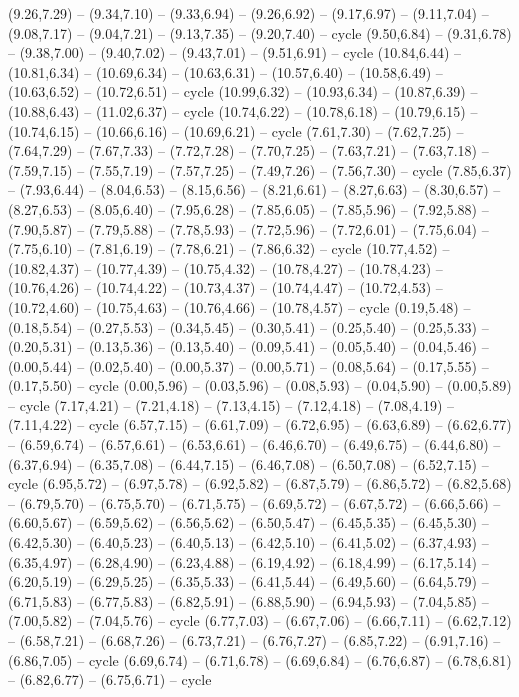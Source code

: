 {  (9.26,7.29) -- (9.34,7.10) -- (9.33,6.94) -- (9.26,6.92) -- (9.17,6.97) -- (9.11,7.04) -- (9.08,7.17) -- (9.04,7.21) -- (9.13,7.35) -- (9.20,7.40) -- cycle
  (9.50,6.84) -- (9.31,6.78) -- (9.38,7.00) -- (9.40,7.02) -- (9.43,7.01) -- (9.51,6.91) -- cycle
  (10.84,6.44) -- (10.81,6.34) -- (10.69,6.34) -- (10.63,6.31) -- (10.57,6.40) -- (10.58,6.49) -- (10.63,6.52) -- (10.72,6.51) -- cycle
  (10.99,6.32) -- (10.93,6.34) -- (10.87,6.39) -- (10.88,6.43) -- (11.02,6.37) -- cycle
  (10.74,6.22) -- (10.78,6.18) -- (10.79,6.15) -- (10.74,6.15) -- (10.66,6.16) -- (10.69,6.21) -- cycle
  (7.61,7.30) -- (7.62,7.25) -- (7.64,7.29) -- (7.67,7.33) -- (7.72,7.28) -- (7.70,7.25) -- (7.63,7.21) -- (7.63,7.18) -- (7.59,7.15) -- (7.55,7.19) -- (7.57,7.25) -- (7.49,7.26) -- (7.56,7.30) -- cycle
  (7.85,6.37) -- (7.93,6.44) -- (8.04,6.53) -- (8.15,6.56) -- (8.21,6.61) -- (8.27,6.63) -- (8.30,6.57) -- (8.27,6.53) -- (8.05,6.40) -- (7.95,6.28) -- (7.85,6.05) -- (7.85,5.96) -- (7.92,5.88) -- (7.90,5.87) -- (7.79,5.88) -- (7.78,5.93) -- (7.72,5.96) -- (7.72,6.01) -- (7.75,6.04) -- (7.75,6.10) -- (7.81,6.19) -- (7.78,6.21) -- (7.86,6.32) -- cycle
  (10.77,4.52) -- (10.82,4.37) -- (10.77,4.39) -- (10.75,4.32) -- (10.78,4.27) -- (10.78,4.23) -- (10.76,4.26) -- (10.74,4.22) -- (10.73,4.37) -- (10.74,4.47) -- (10.72,4.53) -- (10.72,4.60) -- (10.75,4.63) -- (10.76,4.66) -- (10.78,4.57) -- cycle
  (0.19,5.48) -- (0.18,5.54) -- (0.27,5.53) -- (0.34,5.45) -- (0.30,5.41) -- (0.25,5.40) -- (0.25,5.33) -- (0.20,5.31) -- (0.13,5.36) -- (0.13,5.40) -- (0.09,5.41) -- (0.05,5.40) -- (0.04,5.46) -- (0.00,5.44) -- (0.02,5.40) -- (0.00,5.37) -- (0.00,5.71) -- (0.08,5.64) -- (0.17,5.55) -- (0.17,5.50) -- cycle
  (0.00,5.96) -- (0.03,5.96) -- (0.08,5.93) -- (0.04,5.90) -- (0.00,5.89) -- cycle
  (7.17,4.21) -- (7.21,4.18) -- (7.13,4.15) -- (7.12,4.18) -- (7.08,4.19) -- (7.11,4.22) -- cycle}
\expandafter\def\csname geo:gebiet:BHS\endcsname{
  }
\expandafter\def\csname geo:gebiet:FLK\endcsname{
  }
\expandafter\def\csname geo:gebiet:NOR\endcsname{
  (6.57,7.15) -- (6.61,7.09) -- (6.72,6.95) -- (6.63,6.89) -- (6.62,6.77) -- (6.59,6.74) -- (6.57,6.61) -- (6.53,6.61) -- (6.46,6.70) -- (6.49,6.75) -- (6.44,6.80) -- (6.37,6.94) -- (6.35,7.08) -- (6.44,7.15) -- (6.46,7.08) -- (6.50,7.08) -- (6.52,7.15) -- cycle
  (6.95,5.72) -- (6.97,5.78) -- (6.92,5.82) -- (6.87,5.79) -- (6.86,5.72) -- (6.82,5.68) -- (6.79,5.70) -- (6.75,5.70) -- (6.71,5.75) -- (6.69,5.72) -- (6.67,5.72) -- (6.66,5.66) -- (6.60,5.67) -- (6.59,5.62) -- (6.56,5.62) -- (6.50,5.47) -- (6.45,5.35) -- (6.45,5.30) -- (6.42,5.30) -- (6.40,5.23) -- (6.40,5.13) -- (6.42,5.10) -- (6.41,5.02) -- (6.37,4.93) -- (6.35,4.97) -- (6.28,4.90) -- (6.23,4.88) -- (6.19,4.92) -- (6.18,4.99) -- (6.17,5.14) -- (6.20,5.19) -- (6.29,5.25) -- (6.35,5.33) -- (6.41,5.44) -- (6.49,5.60) -- (6.64,5.79) -- (6.71,5.83) -- (6.77,5.83) -- (6.82,5.91) -- (6.88,5.90) -- (6.94,5.93) -- (7.04,5.85) -- (7.00,5.82) -- (7.04,5.76) -- cycle
  (6.77,7.03) -- (6.67,7.06) -- (6.66,7.11) -- (6.62,7.12) -- (6.58,7.21) -- (6.68,7.26) -- (6.73,7.21) -- (6.76,7.27) -- (6.85,7.22) -- (6.91,7.16) -- (6.86,7.05) -- cycle
  (6.69,6.74) -- (6.71,6.78) -- (6.69,6.84) -- (6.76,6.87) -- (6.78,6.81) -- (6.82,6.77) -- (6.75,6.71) -- cycle}
